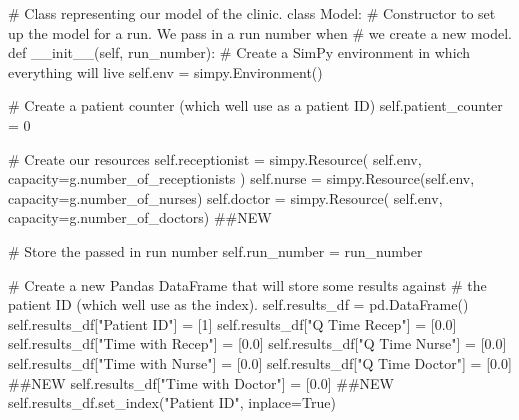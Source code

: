 \documentclass[
  letterpaper,
  DIV=11,
  numbers=noendperiod]{scrreprt}
\newenvironment{Shaded}{}{}
\newcommand{\CommentTok}[1]{\textcolor[rgb]{0.42,0.45,0.49}{#1}}
\newcommand{\DecValTok}[1]{\textcolor[rgb]{0.00,0.36,0.77}{#1}}
\newcommand{\FloatTok}[1]{\textcolor[rgb]{0.00,0.36,0.77}{#1}}
\newcommand{\FunctionTok}[1]{\textcolor[rgb]{0.44,0.26,0.76}{#1}}
\newcommand{\KeywordTok}[1]{\textcolor[rgb]{0.84,0.23,0.29}{#1}}
\newcommand{\NormalTok}[1]{\textcolor[rgb]{0.14,0.16,0.18}{#1}}
\newcommand{\OperatorTok}[1]{\textcolor[rgb]{0.14,0.16,0.18}{#1}}
\newcommand{\StringTok}[1]{\textcolor[rgb]{0.01,0.18,0.38}{#1}}
\newcommand{\VariableTok}[1]{\textcolor[rgb]{0.89,0.38,0.04}{#1}}
\begin{document}
\begin{Shaded}
\begin{Highlighting}[]
\CommentTok{\# Class representing our model of the clinic.}
\KeywordTok{class}\NormalTok{ Model:}
    \CommentTok{\# Constructor to set up the model for a run.  We pass in a run number when}
    \CommentTok{\# we create a new model.}
    \KeywordTok{def} \FunctionTok{\_\_init\_\_}\NormalTok{(}\VariableTok{self}\NormalTok{, run\_number):}
        \CommentTok{\# Create a SimPy environment in which everything will live}
        \VariableTok{self}\NormalTok{.env }\OperatorTok{=}\NormalTok{ simpy.Environment()}

        \CommentTok{\# Create a patient counter (which we\textquotesingle{}ll use as a patient ID)}
        \VariableTok{self}\NormalTok{.patient\_counter }\OperatorTok{=} \DecValTok{0}

        \CommentTok{\# Create our resources}
        \VariableTok{self}\NormalTok{.receptionist }\OperatorTok{=}\NormalTok{ simpy.Resource(}
            \VariableTok{self}\NormalTok{.env, capacity}\OperatorTok{=}\NormalTok{g.number\_of\_receptionists}
\NormalTok{        )}
        \VariableTok{self}\NormalTok{.nurse }\OperatorTok{=}\NormalTok{ simpy.Resource(}\VariableTok{self}\NormalTok{.env, capacity}\OperatorTok{=}\NormalTok{g.number\_of\_nurses)}
        \VariableTok{self}\NormalTok{.doctor }\OperatorTok{=}\NormalTok{ simpy.Resource(}
            \VariableTok{self}\NormalTok{.env, capacity}\OperatorTok{=}\NormalTok{g.number\_of\_doctors) }\CommentTok{\#\#NEW}

        \CommentTok{\# Store the passed in run number}
        \VariableTok{self}\NormalTok{.run\_number }\OperatorTok{=}\NormalTok{ run\_number}

        \CommentTok{\# Create a new Pandas DataFrame that will store some results against}
        \CommentTok{\# the patient ID (which we\textquotesingle{}ll use as the index).}
        \VariableTok{self}\NormalTok{.results\_df }\OperatorTok{=}\NormalTok{ pd.DataFrame()}
        \VariableTok{self}\NormalTok{.results\_df[}\StringTok{"Patient ID"}\NormalTok{] }\OperatorTok{=}\NormalTok{ [}\DecValTok{1}\NormalTok{]}
        \VariableTok{self}\NormalTok{.results\_df[}\StringTok{"Q Time Recep"}\NormalTok{] }\OperatorTok{=}\NormalTok{ [}\FloatTok{0.0}\NormalTok{]}
        \VariableTok{self}\NormalTok{.results\_df[}\StringTok{"Time with Recep"}\NormalTok{] }\OperatorTok{=}\NormalTok{ [}\FloatTok{0.0}\NormalTok{]}
        \VariableTok{self}\NormalTok{.results\_df[}\StringTok{"Q Time Nurse"}\NormalTok{] }\OperatorTok{=}\NormalTok{ [}\FloatTok{0.0}\NormalTok{]}
        \VariableTok{self}\NormalTok{.results\_df[}\StringTok{"Time with Nurse"}\NormalTok{] }\OperatorTok{=}\NormalTok{ [}\FloatTok{0.0}\NormalTok{]}
        \VariableTok{self}\NormalTok{.results\_df[}\StringTok{"Q Time Doctor"}\NormalTok{] }\OperatorTok{=}\NormalTok{ [}\FloatTok{0.0}\NormalTok{] }\CommentTok{\#\#NEW}
        \VariableTok{self}\NormalTok{.results\_df[}\StringTok{"Time with Doctor"}\NormalTok{] }\OperatorTok{=}\NormalTok{ [}\FloatTok{0.0}\NormalTok{] }\CommentTok{\#\#NEW}
        \VariableTok{self}\NormalTok{.results\_df.set\_index(}\StringTok{"Patient ID"}\NormalTok{, inplace}\OperatorTok{=}\VariableTok{True}\NormalTok{)}


\end{Highlighting}
\end{Shaded}
\end{document}
